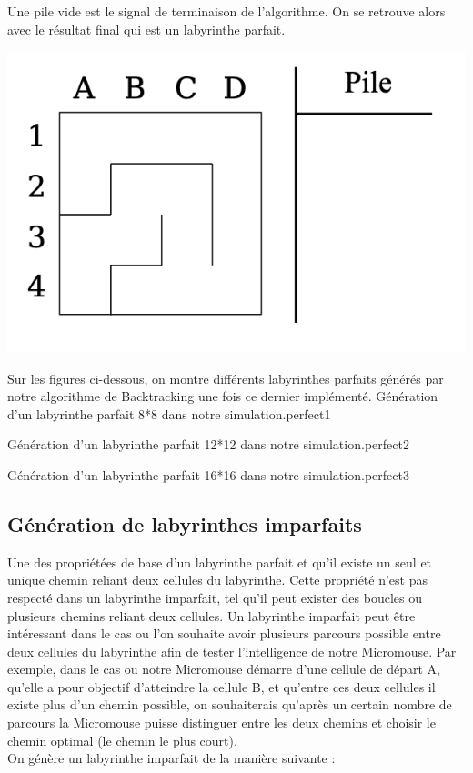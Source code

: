 \begin{minipage}{0.6\textwidth}
Une pile vide est le signal de terminaison de l'algorithme. On se retrouve alors avec le résultat final qui est un labyrinthe parfait.
\\

\end{minipage}
\begin{minipage}{0.42\textwidth}
\includegraphics[width=\linewidth]{pics/backtracking8.png}
\end{minipage}

Sur les figures ci-dessous, on montre différents labyrinthes parfaits générés par notre algorithme de Backtracking une fois ce dernier implémenté.
{Génération d'un labyrinthe parfait 8*8 dans notre simulation.}{perfect1}
\newpage

{Génération d'un labyrinthe parfait 12*12 dans notre simulation.}{perfect2}

{Génération d'un labyrinthe parfait 16*16 dans notre simulation.}{perfect3}

\subsection{Génération de labyrinthes imparfaits}
Une des propriétées de base d'un labyrinthe parfait et qu'il existe un seul et unique chemin reliant deux cellules du labyrinthe. Cette propriété n'est pas respecté dans un labyrinthe imparfait, tel qu'il peut exister des boucles ou plusieurs chemins reliant deux cellules. Un labyrinthe imparfait peut être intéressant dans le cas ou l'on souhaite avoir plusieurs parcours possible entre deux cellules du labyrinthe afin de tester l'intelligence de notre Micromouse. Par exemple, dans le cas ou notre Micromouse démarre d'une cellule de départ A, qu'elle a pour objectif d'atteindre la cellule B, et qu'entre ces deux cellules il existe plus d'un chemin possible, on souhaiterais qu'après un certain nombre de parcours la Micromouse puisse distinguer entre les deux chemins et choisir le chemin optimal (le chemin le plus court).
\\
\newline
On génère un labyrinthe imparfait de la manière suivante :

